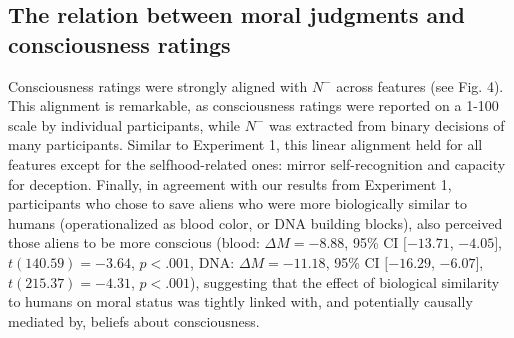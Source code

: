 \documentclass[10pt, letterpaper]{article}
\begin{document}
\hypertarget{the-relation-between-moral-judgments-and-consciousness-ratings-1}{%
\subsection{The relation between moral judgments and consciousness
ratings}\label{the-relation-between-moral-judgments-and-consciousness-ratings-1}}

Consciousness ratings were strongly aligned with \(N^-\) across features
(see Fig. 4). This alignment is remarkable, as consciousness ratings
were reported on a 1-100 scale by individual participants, while \(N^-\)
was extracted from binary decisions of many participants. Similar to
Experiment 1, this linear alignment held for all features except for the
selfhood-related ones: mirror self-recognition and capacity for
deception. Finally, in agreement with our results from Experiment 1,
participants who chose to save aliens who were more biologically similar
to humans (operationalized as blood color, or DNA building blocks), also
perceived those aliens to be more conscious (blood:
\(\Delta M = -8.88\), 95\% CI \([-13.71\), \(-4.05]\),
\(t(140.59) = -3.64\), \(p < .001\), DNA: \(\Delta M = -11.18\), 95\% CI
\([-16.29\), \(-6.07]\), \(t(215.37) = -4.31\), \(p < .001\)),
suggesting that the effect of biological similarity to humans on moral
status was tightly linked with, and potentially causally mediated by,
beliefs about consciousness.
\end{document}
